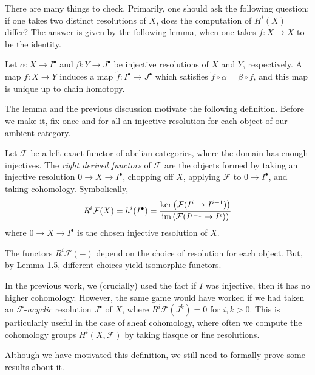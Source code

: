 There are many things to check. Primarily, one should ask the following
question: if one takes two distinct resolutions of $X$, does the computation of
$H^i(X)$ differ? The answer is given by the following lemma, when one takes $f :
X \to X$ to be the identity.

\begin{lemma}
    Let $\alpha : X \to I^\bullet$ and $\beta : Y \to J^\bullet$ be injective
    resolutions of $X$ and $Y$, respectively. A map $f : X \to Y$ induces a map
    $\tilde{f} : I^\bullet \to J^\bullet$ which satisfies $\tilde{f} \circ
    \alpha = \beta \circ f$, and this map is unique up to chain homotopy.
\end{lemma}

The lemma and the previous discussion motivate the following definition. Before
we make it, fix once and for all an injective resolution for each object of our
ambient category.

\begin{definition}
    Let $\mathcal{F}$ be a left exact functor of abelian categories, where the
    domain has enough injectives. The \textit{right derived functors} of
    $\mathcal{F}$ are the objects formed by taking an injective resolution $0
    \to X \to I^\bullet$, chopping off $X$, applying $\mathcal{F}$ to $0 \to
    I^\bullet$, and taking cohomology. Symbolically,
    \[
        R^i\mathcal{F}(X) = h^i(I^\bullet) = \frac{\ker\left( \mathcal{F}(I^i
                \to I^{i+1})\right)}{\operatorname{im}\left( \mathcal{F}(I^{i-1} \to
                I^i)\right)} \]
    where $0 \to X \to I^\bullet$ is the chosen injective resolution of $X$.
\end{definition}

The functors $R^i \mathcal{F}({-})$ depend on the choice of resolution for each
object. But, by Lemma 1.5, different choices yield isomorphic functors.

\begin{remark}
    In the previous work, we (crucially) used the fact if $I$ was injective,
    then it has no higher cohomology. However, the same game would have worked
    if we had taken an $\mathcal{F}$-\textit{acyclic} resolution $J^\bullet$ of
    $X$, where $R^{i}\mathcal{F}(J^k) = 0$ for $i, k > 0$. This is particularly
    useful in the case of sheaf cohomology, where often we compute the
    cohomology groups $H^i(X, \mathcal{F})$ by taking flasque or fine
    resolutions.
\end{remark}

Although we have motivated this definition, we still need to formally prove some
results about it.

